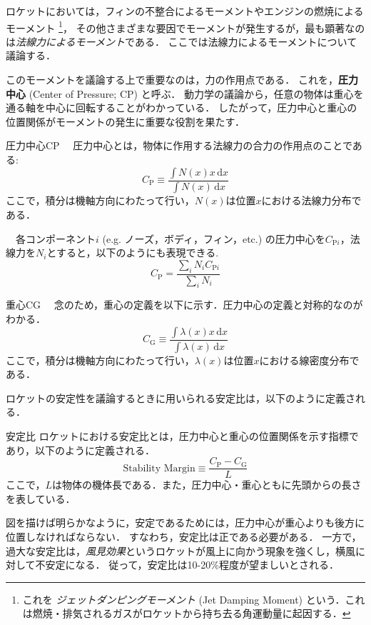 \documentclass[uplatex,dvipdfmx,a4j,11pt]{jsreport}
\newcommand{\keyword}[1]{\textcolor{mainblue}{\textbf{#1}}}
\newcommand{\diff}{\mathrm{d}} %
\numberwithin{equation}{chapter}
\begin{document}
ロケットにおいては，フィンの不整合によるモーメントやエンジンの燃焼によるモーメント
\footnote{これを \emph{ジェットダンピングモーメント} (Jet Damping Moment) という．これは燃焼・排気されるガスがロケットから持ち去る角運動量に起因する．}，
その他さまざまな要因でモーメントが発生するが，最も顕著なのは\emph{法線力によるモーメント}である．
ここでは法線力によるモーメントについて議論する．

このモーメントを議論する上で重要なのは，力の作用点である．
これを，\keyword{圧力中心} (Center of Pressure; CP) と呼ぶ．
動力学の議論から，任意の物体は重心を通る軸を中心に回転することがわかっている．
したがって，圧力中心と重心の位置関係がモーメントの発生に重要な役割を果たす．
\begin{definition}{圧力中心}{CP}{}
  　圧力中心とは，物体に作用する法線力の合力の作用点のことである:
    \begin{equation}
      C_\mathrm{P} \equiv \frac{\int N(x)x\,\diff x}{\int N(x)\,\diff x}
    \end{equation}
  ここで，積分は機軸方向にわたって行い，$N(x)$は位置$x$における法線力分布である．

  　各コンポーネント$i$ (e.g. ノーズ，ボディ，フィン，etc.) の圧力中心を$C_{\mathrm{P}i}$，法線力を$N_i$とすると，以下のようにも表現できる.
  \begin{equation}
    C_\mathrm{P} = \frac{\sum_i N_i C_{\mathrm{P}i}}{\sum_i N_i}
  \end{equation}
\end{definition}

\begin{remark}{重心}{CG}{}
  　念のため，重心の定義を以下に示す．圧力中心の定義と対称的なのがわかる．
    \begin{equation}
      C_\mathrm{G} \equiv \frac{\int \lambda(x)x\,\diff x}{\int \lambda(x)\,\diff x}
    \end{equation}
  ここで，積分は機軸方向にわたって行い，$\lambda(x)$は位置$x$における線密度分布である．
\end{remark}

ロケットの安定性を議論するときに用いられる安定比は，以下のように定義される．
\begin{definition}{安定比}{}{}
  ロケットにおける安定比とは，圧力中心と重心の位置関係を示す指標であり，以下のように定義される．
    \begin{equation}
      \text{Stability Margin} \equiv \frac{C_\mathrm{P} - C_\mathrm{G}}{L}
    \end{equation}
  ここで，$L$は物体の機体長である．また，圧力中心・重心ともに先頭からの長さを表している．
\end{definition}
図を描けば明らかなように，安定であるためには，圧力中心が重心よりも後方に位置しなければならない．
すなわち，安定比は正である必要がある．
一方で，過大な安定比は，\emph{風見効果}というロケットが風上に向かう現象を強くし，横風に対して不安定になる．
従って，安定比は10-20\%程度が望ましいとされる．
\end{document}

